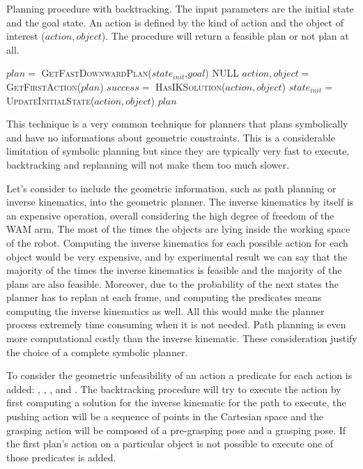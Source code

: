 \begin{algorithm}
\caption{Planning procedure with backtracking. The input parameters are the initial state and the goal state. An action is defined by the kind of action and the object of interest ($action, object$). The procedure will return a feasible plan or not plan at all.}\label{alg:backtracking}
\begin{algorithmic}
\Repeat
  \State $plan =$ \textsc{GetFastDownwardPlan}($state_{init}$,$goal$)
  		\Return NULL 
  \EndIf
  \State $action, object =$ \textsc{GetFirstAction}($plan$)
  \State $success =$ \textsc{HasIKSolution}($action, object$) 
    \State $state_{init} =$ \textsc{UpdateInitialState}($action, object$) 
  \EndIf
{}
\Return $plan$
\EndProcedure
\end{algorithmic}
\end{algorithm}  

This technique is a very common technique for planners that plans symbolically and have no informations about geometric constraints. This is a considerable limitation of symbolic planning but since they are typically very fast to execute, backtracking and replanning will not make them too much slower.

Let's consider to include the geometric information, such as path planning or inverse kinematics, into the geometric planner. The inverse kinematics by itself is an expensive operation, overall considering the high degree of freedom of the WAM arm. The most of the times the objects are lying inside the working space of the robot. Computing the inverse kinematics for each possible action for each object would be very expensive, and by experimental result we can say that the majority of the times the inverse kinematics is feasible and the majority of the plans are also feasible. Moreover, due to the probability of the next states the planner has to replan at each frame, and computing the predicates means computing the inverse kinematics as well. All this would make the planner process extremely time consuming when it is not needed. Path planning is even more computational costly than the inverse kinematic. These consideration justify the choice of a complete symbolic planner.
  
To consider the geometric unfeasibility of an action a predicate for each action is added: ,  ,  , \linebreak {} and  . The backtracking procedure will try to execute the action by first computing a solution for the inverse kinematic for the path to execute, the pushing action will be a sequence of points in the Cartesian space and the grasping action will be composed of a pre-grasping pose and a grasping pose. If the first plan's action on a particular object is not possible to execute one of those predicates is added. 


